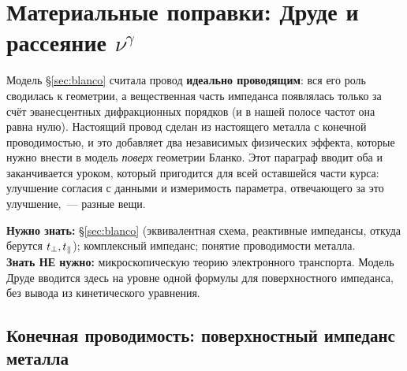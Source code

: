 %
%
\section{Материальные поправки: Друде и рассеяние \texorpdfstring{$\nu^\gamma$}{nu\^{}gamma}}
\label{sec:drude}

Модель §\ref{sec:blanco} считала провод \textbf{идеально проводящим}: вся его роль сводилась к
геометрии, а вещественная часть импеданса появлялась только за счёт эванесцентных дифракционных
порядков (и в нашей полосе частот она равна нулю). Настоящий провод сделан из настоящего металла
с конечной проводимостью, и это добавляет два независимых физических эффекта, которые нужно
внести в модель \emph{поверх} геометрии Бланко. Этот параграф вводит оба и заканчивается уроком,
который пригодится для всей оставшейся части курса: улучшение согласия с данными и измеримость
параметра, отвечающего за это улучшение,~--- разные вещи.

\begin{tcolorbox}[enhanced,colback=cPanel,colframe=cGrid,boxrule=0.8pt,arc=2pt,
                  title={\bfseries\color{cAccent} Пререквизиты},coltitle=cAccent,
                  attach boxed title to top left={xshift=6pt,yshift=-2pt},
                  boxed title style={colback=cPanel,boxrule=0pt,arc=0pt},top=10pt]
\textbf{Нужно знать:} §\ref{sec:blanco} (эквивалентная схема, реактивные импедансы, откуда
берутся $t_{\perp},t_{\parallel}$); комплексный импеданс; понятие проводимости металла.\\[0.3em]
\textbf{Знать НЕ нужно:} микроскопическую теорию электронного транспорта. Модель Друде вводится
здесь на уровне одной формулы для поверхностного импеданса, без вывода из кинетического
уравнения.
\end{tcolorbox}

\subsection{Конечная проводимость: поверхностный импеданс металла}
\label{subsec:drude-impedance}

